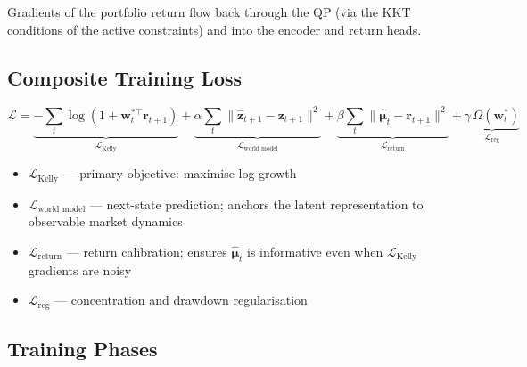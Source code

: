 \documentclass[11pt, a4paper]{article}
\begin{document}
Gradients of the portfolio return flow back through the QP (via the KKT
conditions of the active constraints) and into the encoder and return heads.

\subsection{Composite Training Loss}

\begin{equation}\label{eq:loss}
  \mathcal{L} = \underbrace{-\sum_t \log(1 + \mathbf{w}_t^{*\top}\mathbf{r}_{t+1})}_{\mathcal{L}_\text{Kelly}}
  + \underbrace{\alpha \sum_t \|\hat{\mathbf{z}}_{t+1} - \mathbf{z}_{t+1}\|^2}_{\mathcal{L}_\text{world model}}
  + \underbrace{\beta \sum_t \|\hat{\boldsymbol{\mu}}_t - \mathbf{r}_{t+1}\|^2}_{\mathcal{L}_\text{return}}
  + \underbrace{\gamma \,\Omega(\mathbf{w}_t^*)}_{\mathcal{L}_\text{reg}}
\end{equation}

\begin{itemize}[noitemsep]
  \item $\mathcal{L}_\text{Kelly}$ — primary objective: maximise log-growth
  \item $\mathcal{L}_\text{world model}$ — next-state prediction; anchors the
        latent representation to observable market dynamics
  \item $\mathcal{L}_\text{return}$ — return calibration; ensures
        $\hat{\boldsymbol{\mu}}_t$ is informative even when
        $\mathcal{L}_\text{Kelly}$ gradients are noisy
  \item $\mathcal{L}_\text{reg}$ — concentration and drawdown regularisation
\end{itemize}

\subsection{Training Phases}
\end{document}

